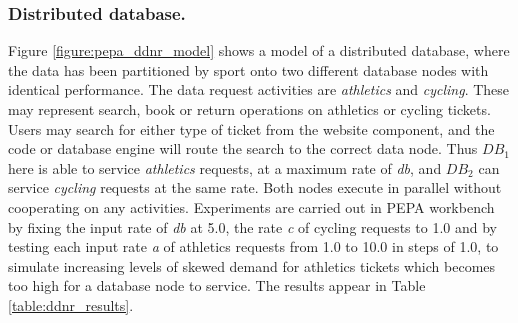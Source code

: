 %
%

\begin{shaded}
\subsubsection{Distributed database.} Figure \ref{figure:pepa_ddnr_model} shows a model of a distributed database, where the data has been partitioned by sport onto two different database nodes with identical performance.  The data request activities are {\itshape athletics} and {\itshape cycling}.  These may represent search, book or return operations on athletics or cycling tickets.  Users may search for either type of ticket from the website component, and the code or database engine will route the search to the correct data node.  Thus $\mathit{DB_1}$ here is able to service {\itshape athletics} requests, at a maximum rate of {\itshape db}, and $\mathit{DB_2}$ can service {\itshape cycling} requests at the same rate.  Both nodes execute in parallel without cooperating on any activities.
Experiments are carried out in PEPA workbench by fixing the input rate of {\itshape db} at 5.0, the rate {\itshape c} of cycling requests to 1.0 and by testing each input rate {\itshape a} of athletics requests from 1.0 to 10.0 in steps of 1.0, to simulate increasing levels of skewed demand for athletics tickets which becomes too high for a database node to service.  The results appear in Table \ref{table:ddnr_results}.
\end{shaded}

